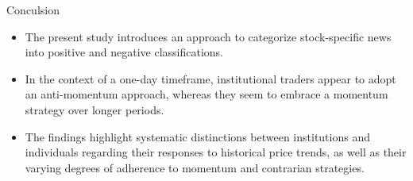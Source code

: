 \documentclass{beamer}
\begin{document}
\begin{frame}{Conculsion}

    \begin{itemize}
        \item The present study introduces an approach to categorize stock-specific news into positive and negative classifications.
        \item In the context of a one-day timeframe, institutional traders appear to adopt an anti-momentum approach, whereas they seem to embrace a momentum strategy over longer periods.
        \item The findings highlight systematic distinctions between institutions and individuals regarding their responses to historical price trends, as well as their varying degrees of adherence to momentum and contrarian strategies.
    \end{itemize}

\end{frame}









\end{document}
